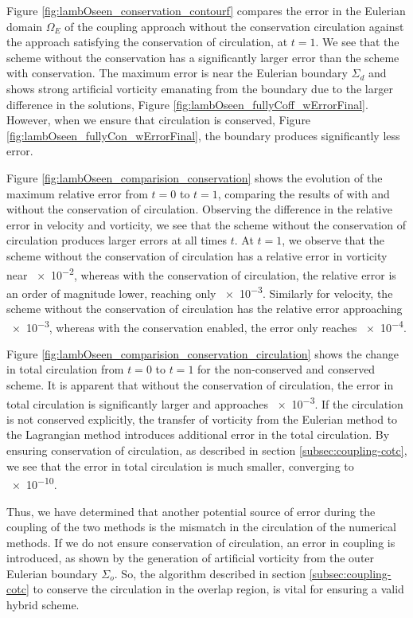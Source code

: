 Figure \ref{fig:lambOseen_conservation_contourf} compares the error in the Eulerian domain $\Omega_E$ of the coupling approach without the conservation circulation against the approach satisfying the conservation of circulation, at $t=1$. We see that the scheme without the conservation has a significantly larger error than the scheme with conservation. The maximum error is near the Eulerian boundary $\Sigma_d$ and shows strong artificial vorticity emanating from the boundary due to the larger difference in the solutions, Figure \ref{fig:lambOseen_fullyCoff_wErrorFinal}. However, when we ensure that circulation is conserved, Figure \ref{fig:lambOseen_fullyCon_wErrorFinal}, the boundary produces significantly less error.
	

Figure \ref{fig:lambOseen_comparision_conservation} shows the evolution of the maximum relative error from $t=0$ to $t=1$, comparing the results of with and without the conservation of circulation. Observing the difference in the relative error in velocity and vorticity, we see that the scheme without the conservation of circulation produces larger errors at all times $t$. At $t=1$, we observe that the scheme without the conservation of circulation has a relative error in vorticity near \num{e-2}, whereas with the conservation of circulation, the relative error is an order of magnitude lower, reaching only \num{e-3}. Similarly for velocity, the scheme without the conservation of circulation has the relative error approaching \num{e-3}, whereas with the conservation enabled, the error only reaches \num{e-4}. 

Figure \ref{fig:lambOseen_comparision_conservation_circulation} shows the change in total circulation from $t=0$ to $t=1$ for the non-conserved and conserved scheme. It is apparent that without the conservation of circulation, the error in total circulation is significantly larger and approaches \num{e-3}. If the circulation is not conserved explicitly, the transfer of vorticity from the Eulerian method to the Lagrangian method introduces additional error in the total circulation. By ensuring conservation of circulation, as described in section \ref{subsec:coupling-cotc}, we see that the error in total circulation is much smaller, converging to \num{e-10}. %

Thus, we have determined that another potential source of error during the coupling of the two methods is the mismatch in the circulation of the numerical methods. If we do not ensure conservation of circulation, an error in coupling is introduced, as shown by the generation of artificial vorticity from the outer Eulerian boundary $\Sigma_o$. So, the algorithm described in section \ref{subsec:coupling-cotc} to conserve the circulation in the overlap region, is vital for ensuring a valid hybrid scheme.

